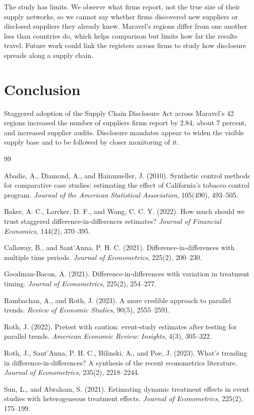 \documentclass[11pt]{article}
\begin{document}
The study has limits. We observe what firms report, not the true size of their supply networks, so we cannot say whether firms discovered new suppliers or disclosed suppliers they already knew. Maravel's regions differ from one another less than countries do, which helps comparison but limits how far the results travel. Future work could link the registers across firms to study how disclosure spreads along a supply chain.

\section{Conclusion}

Staggered adoption of the Supply Chain Disclosure Act across Maravel's 42 regions increased the number of suppliers firms report by 2.84, about 7 percent, and increased supplier audits. Disclosure mandates appear to widen the visible supply base and to be followed by closer monitoring of it.

\begin{thebibliography}{99}
\setlength{\itemsep}{2pt}
\small

 Abadie, A., Diamond, A., and Hainmueller, J. (2010). Synthetic control methods for comparative case studies: estimating the effect of California's tobacco control program. \textit{Journal of the American Statistical Association}, 105(490), 493--505.

 Baker, A. C., Larcker, D. F., and Wang, C. C. Y. (2022). How much should we trust staggered difference-in-differences estimates? \textit{Journal of Financial Economics}, 144(2), 370--395.

 Callaway, B., and Sant'Anna, P. H. C. (2021). Difference-in-differences with multiple time periods. \textit{Journal of Econometrics}, 225(2), 200--230.

 Goodman-Bacon, A. (2021). Difference-in-differences with variation in treatment timing. \textit{Journal of Econometrics}, 225(2), 254--277.

 Rambachan, A., and Roth, J. (2023). A more credible approach to parallel trends. \textit{Review of Economic Studies}, 90(5), 2555--2591.

 Roth, J. (2022). Pretest with caution: event-study estimates after testing for parallel trends. \textit{American Economic Review: Insights}, 4(3), 305--322.

 Roth, J., Sant'Anna, P. H. C., Bilinski, A., and Poe, J. (2023). What's trending in difference-in-differences? A synthesis of the recent econometrics literature. \textit{Journal of Econometrics}, 235(2), 2218--2244.

 Sun, L., and Abraham, S. (2021). Estimating dynamic treatment effects in event studies with heterogeneous treatment effects. \textit{Journal of Econometrics}, 225(2), 175--199.

\end{thebibliography}
\end{document}
